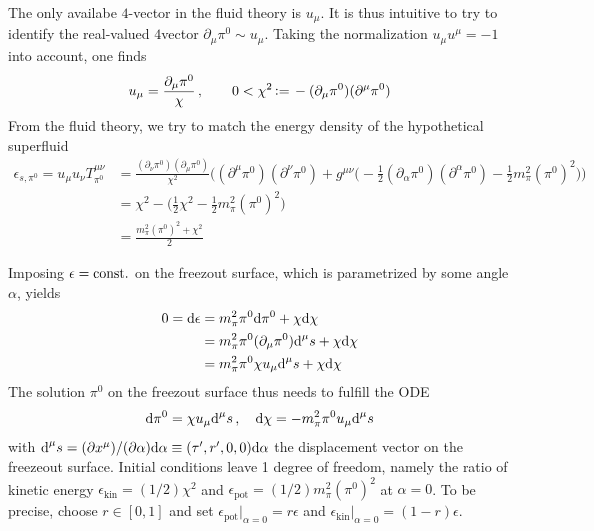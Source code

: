 The only availabe $4$-vector in the fluid theory is $u_\mu$. It is thus intuitive to try to identify the real-valued $4$vector $\partial_\mu\pi^0\sim u_\mu$. Taking the normalization $u_\mu u^\mu=-1$ into account, one finds
\begin{equation}
    u_\mu=\frac{\partial_\mu\pi^0}{\chi}\,,\qquad0<\chi^2{\,\vcentcolon=\,}-(\partial_\mu\pi^0)(\partial^\mu\pi^0)
\end{equation}
From the fluid theory, we try to match the energy density of the hypothetical superfluid
\begin{subequations}
    \begin{align}
        \epsilon_{s,\pi^0}=u_\mu u_\nu T^{\mu\nu}_{\pi^0}&=\frac{(\partial_\nu\pi^0)(\partial_\mu\pi^0)}{\chi^2}\Big((\partial^\mu\pi^0)(\partial^\nu\pi^0)+g^{\mu\nu}\big(-\frac{1}{2}(\partial_\alpha\pi^0)(\partial^\alpha\pi^0)-\frac{1}{2}m_\pi^2(\pi^0)^2\big)\Big)\\
        &=\chi^2-\big(\frac{1}{2}\chi^2-\frac{1}{2}m_\pi^2(\pi^0)^2\big)\\
        &=\frac{m_\pi^2(\pi^0)^2+\chi^2}{2}
    \end{align}
\end{subequations}

Imposing $\epsilon={\text{const.}}$ on the freezout surface, which is parametrized by some angle $\alpha$, yields
\begin{subequations}
    \begin{align}
        0=\text{d}\epsilon&=m_\pi^2\pi^0\text{d}\pi^0+\chi\text{d}\chi\\
        &=m_\pi^2\pi^0(\partial_\mu\pi^0)\text{d}^\mu s+\chi\text{d}\chi\\
        &=m_\pi^2\pi^0\chi u_\mu\text{d}^\mu s+\chi\text{d}\chi
    \end{align}
\end{subequations}
The solution $\pi^0$ on the freezout surface thus needs to fulfill the ODE
    \begin{equation}
        \text{d}\pi^0=\chi u_\mu\text{d}^\mu s\,,\quad
        \text{d}\chi=-m_\pi^2\pi^0 u_\mu\text{d}^\mu s
    \end{equation}
    with $\text{d}^\mu s=(\partial x^\mu)/(\partial\alpha)\text{d}\alpha\equiv(\tau^\prime,r^\prime,0,0)\text{d}\alpha$ the displacement vector on the freezeout surface. Initial conditions leave 1 degree of freedom, namely the ratio of kinetic energy $\epsilon_{\text{kin}}=(1/2)\chi^2$ and $\epsilon_{\text{pot}}=(1/2)m_\pi^2(\pi^0)^2$ at $\alpha=0$. To be precise, choose $r\in[0,1]$ and set $\epsilon_{\text{pot}}\big\vert_{\alpha=0}=r\epsilon$ and $\epsilon_{\text{kin}}\big\vert_{\alpha=0}=(1-r)\epsilon$.

